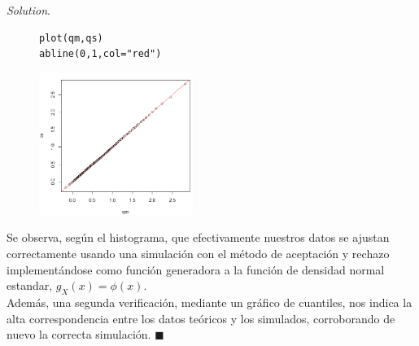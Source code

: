 \documentclass[11pt]{article}
\renewcommand{\=}[1]{\stackrel{#1}{=}} %
\theoremstyle{definition}
\theoremstyle{remark}
\newenvironment{solution}{%
\begin{trivlist} \item \textit{Solution}. }{%
\hspace*{\fill} $\blacksquare$\end{trivlist}}
\begin{document}
\begin{itemize}
\begin{solution}
\begin{figure}[h]
\begin{minipage}{10.3cm}
{\begin{lstlisting}[style=myRstyle, caption={Verificación mediante gráfica de cuantiles / SN.}]
plot(qm,qs)
abline(0,1,col="red")
			\end{lstlisting}
		}			
	\end{minipage}
	\begin{minipage}{6cm}
		\includegraphics[width=5cm]{a3}
	\end{minipage}
\end{figure}
Se observa, según el histograma, que efectivamente nuestros datos se ajustan correctamente usando una simulación con el método de aceptación y rechazo implementándose como función generadora a la función de densidad normal estandar, $g_X(x)=\phi(x)$.\\
Además, una segunda verificación, mediante un gráfico de cuantiles, nos indica la alta correspondencia entre los datos teóricos y los simulados, corroborando de nuevo la correcta simulación.
	\end{solution}
\end{itemize}

\newpage
\end{document}
